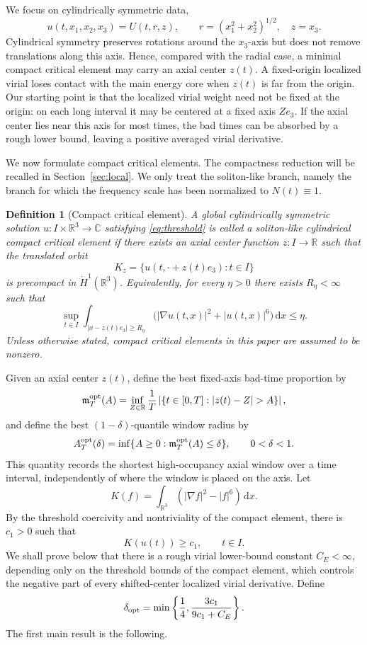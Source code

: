 \documentclass[preprint,12pt]{elsarticle}
\numberwithin{equation}{section}
\newcommand{\R}{\mathbb R}
\newcommand{\C}{\mathbb C}
\newcommand{\dd}{\,\mathrm d}
\newcommand{\na}{\nabla}
\newcommand{\ez}{e_3}
\newcommand{\mopt}{\mathfrak m^{\rm opt}}
\newcommand{\Aopt}{A^{\rm opt}}
\newtheorem{definition}[theorem]{Definition}
\theoremstyle{remark}
\begin{document}
We focus on cylindrically symmetric data,
\[
  u(t,x_1,x_2,x_3)=U(t,r,z),
  \qquad r=(x_1^2+x_2^2)^{1/2},\quad z=x_3.
\]
Cylindrical symmetry preserves rotations around the $x_3$-axis but does not remove translations along this axis.  Hence, compared with the radial case, a minimal compact critical element may carry an axial center $z(t)$.  A fixed-origin localized virial loses contact with the main energy core when $z(t)$ is far from the origin.  Our starting point is that the localized virial weight need not be fixed at the origin: on each long interval it may be centered at a fixed axis $Z\ez$.  If the axial center lies near this axis for most times, the bad times can be absorbed by a rough lower bound, leaving a positive averaged virial derivative.

We now formulate compact critical elements.  The compactness reduction will be recalled in Section~\ref{sec:local}.  We only treat the soliton-like branch, namely the branch for which the frequency scale has been normalized to $N(t)\equiv1$.

\begin{definition}[Compact critical element]\label{def:compact-element}
A global cylindrically symmetric solution $u:I\times\R^3\to\C$ satisfying \eqref{eq:threshold} is called a soliton-like cylindrical compact critical element if there exists an axial center function $z:I\to\R$ such that the translated orbit
\[
  K_z=\{u(t,\cdot+z(t)\ez):t\in I\}
\]
is precompact in $\dot H^1(\R^3)$.  Equivalently, for every $\eta>0$ there exists $R_\eta<\infty$ such that
\begin{equation}\label{eq:tightness}
  \sup_{t\in I}\int_{|x-z(t)\ez|\ge R_\eta}
  \bigl(|\na u(t,x)|^2+|u(t,x)|^6\bigr)\dd x\le \eta.
\end{equation}
Unless otherwise stated, compact critical elements in this paper are assumed to be nonzero.
\end{definition}

Given an axial center $z(t)$, define the best fixed-axis bad-time proportion by
\[
  \mopt_T(A)=\inf_{Z\in\R}\frac1T
  \left|\{t\in[0,T]: |z(t)-Z|>A\}\right|,
\]
and define the best $(1-\delta)$-quantile window radius by
\begin{equation}\label{eq:Aopt-def-intro}
  \Aopt_T(\delta)=\inf\{A\ge0:\mopt_T(A)\le\delta\},\qquad 0<\delta<1.
\end{equation}
This quantity records the shortest high-occupancy axial window over a time interval, independently of where the window is placed on the axis.  Let
\[
  K(f)=\int_{\R^3}(|\na f|^2-|f|^6)\dd x.
\]
By the threshold coercivity and nontriviality of the compact element, there is $c_1>0$ such that
\[
  K(u(t))\ge c_1,
  \qquad t\in I.
\]
We shall prove below that there is a rough virial lower-bound constant $C_E<\infty$, depending only on the threshold bounds of the compact element, which controls the negative part of every shifted-center localized virial derivative.  Define
\begin{equation}\label{eq:delta-opt-intro}
  \delta_{\rm opt}=\min\left\{\frac14,\frac{3c_1}{9c_1+C_E}\right\}.
\end{equation}
The first main result is the following.
\end{document}
